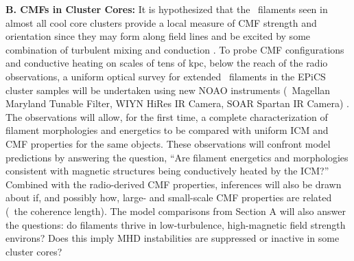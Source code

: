 \documentclass[letterpaper,12pt]{article}
\begin{document}
{\bf{B. CMFs in Cluster Cores:}} It is hypothesized that the
\halpha\ filaments seen in almost all cool core clusters provide a
local measure of CMF strength and orientation since they may form
along field lines and be excited by some combination of turbulent
mixing and conduction \citep{2010ApJ...720..652S,
  2010MNRAS.407.2063W}. To probe CMF configurations and conductive
heating on scales of tens of kpc, below the reach of the radio
observations, a uniform optical survey for extended \halpha\ filaments
in the EPiCS cluster samples will be undertaken using new NOAO
instruments (\ie\ Magellan Maryland Tunable Filter, WIYN HiRes IR
Camera, SOAR Spartan IR Camera) \citep[see][for
  method]{mcdonald10}. The observations will allow, for the first
time, a complete characterization of filament morphologies and
energetics to be compared with uniform ICM and CMF properties for the
same objects. These observations will confront model predictions by
answering the question, ``Are filament energetics and morphologies
consistent with magnetic structures being conductively heated by the
ICM?''  Combined with the radio-derived CMF properties, inferences
will also be drawn about if, and possibly how, large- and small-scale
CMF properties are related (\eg\ the coherence length). The model
comparisons from Section A will also answer the questions: do
filaments thrive in low-turbulence, high-magnetic field strength
environs? Does this imply MHD instabilities are suppressed or inactive
in some cluster cores?
\end{document}
